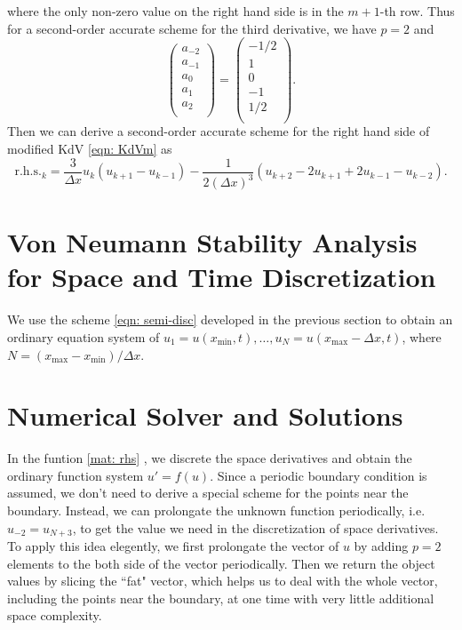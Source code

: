\documentclass{assignment}[2019/10/15]
\begin{document}
    where the only non-zero value on the right hand side is in the $m+1$-th row. Thus for a second-order accurate scheme for the third derivative, we have $p=2$ and
    \begin{equation}
        \begin{pmatrix}
            a_{-2}\\
            a_{-1}\\
            a_{0}\\
            a_1\\
            a_2\\
        \end{pmatrix}
        =
        \begin{pmatrix}
            -1/2\\
            1\\
            0\\
            -1\\
            1/2\\
        \end{pmatrix}.
    \end{equation}
    Then we can derive a second-order accurate scheme for the right hand side of modified KdV \ref{eqn: KdVm} as
    \begin{equation}\label{eqn: semi-disc}
        \text{r.h.s.}_k = \frac3{\Delta x}u_k(u_{k+1}-u_{k-1}) - \frac{1}{2(\Delta x)^3}(u_{k+2}-2u_{k+1}+2u_{k-1}-u_{k-2}).
    \end{equation}

    \section{Von Neumann Stability Analysis for Space and Time Discretization}

    We use the scheme \ref{eqn: semi-disc} developed in the previous section to obtain an ordinary equation system of $u_1=u(x_{\text{min}}, t), \dotsc, u_N = u(x_{\text{max}}-\Delta x, t)$, where $N = (x_{\text{max}}-x_{\text{min}})/\Delta x$.

    \section{Numerical Solver and Solutions}

    In the funtion \ref{mat: rhs} , we discrete the space derivatives and obtain the ordinary function system $u'=f(u)$. Since a periodic boundary condition is assumed, we don't need to derive a special scheme for the points near the boundary. Instead, we can prolongate the unknown function periodically, i.e. $u_{-2}=u_{N+3}$, to get the value we need in the discretization of space derivatives. To apply this idea elegently, we first prolongate the vector of $u$ by adding $p=2$ elements to the both side of the vector periodically. Then we return the object values by slicing the ``fat" vector, which helps us to deal with the whole vector, including the points near the boundary, at one time with very little additional space complexity.
\end{document}
